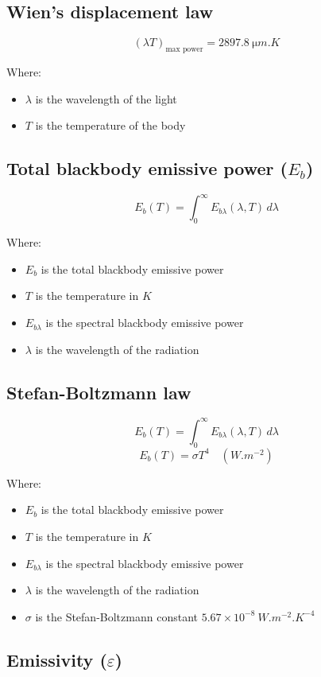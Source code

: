 \documentclass[11pt]{article}
\begin{document}
\subsection{Wien's displacement law}
\label{sec:orgdb7f9e2}
\[(\lambda T)_{\text{max power}} = \qty{2897.8}{\micro m.K}\]

Where:
\begin{itemize}
\item \(\lambda\) is the wavelength of the light
\item \(T\) is the temperature of the body
\end{itemize}
\subsection{Total blackbody emissive power (\(E_b\))}
\label{sec:orgc426284}
\[E_b (T) = \int_0^{\infty} E_{b \lambda} (\lambda, T) \, d \lambda\]

Where:
\begin{itemize}
\item \(E_b\) is the total blackbody emissive power
\item \(T\) is the temperature in \(\unit{K}\)
\item \(E_{b \lambda}\) is the spectral blackbody emissive power
\item \(\lambda\) is the wavelength of the radiation
\end{itemize}
\subsection{Stefan-Boltzmann law}
\label{sec:orga1588d5}
\[E_b (T) = \int_0^{\infty} E_{b \lambda} (\lambda, T) \, d \lambda\]
\[E_b (T) = \sigma T^4 \quad (\unit{W.m^{-2}})\]

Where:
\begin{itemize}
\item \(E_b\) is the total blackbody emissive power
\item \(T\) is the temperature in \(\unit{K}\)
\item \(E_{b \lambda}\) is the spectral blackbody emissive power
\item \(\lambda\) is the wavelength of the radiation
\item \(\sigma\) is the Stefan-Boltzmann constant \(5.67 \times 10^{-8} \ \unit{W.m^{-2}.K^{-4}}\)
\end{itemize}
\subsection{Emissivity (\(\varepsilon\))}
\label{sec:org20dd6bc}
\end{document}
